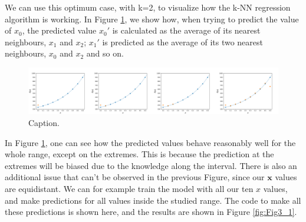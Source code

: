 \documentclass{article}%
\begin{document}
We can use this optimum case, with k=2, to visualize how the k-NN regression algorithm is working. In Figure \ref{fig:Fig2}, we show how, when trying to predict the value of $x_0$, the predicted value $x_0'$ is calculated as the average of its nearest neighbours, $x_1$ and $x_2$; $x_1'$ is predicted as the average of its two nearest neighbours, $x_0$ and $x_2$ and so on.

\begin{figure}[!htbp]
	\centering
	\includegraphics[width=1.0\textwidth]{figures/Fig2.png}
	\caption{Caption.}
	\label{fig:Fig2}
\end{figure}


In Figure \ref{fig:Fig2}, one can see how the predicted values behave reasonably well for the whole range, except on the extremes. This is because the prediction at the extremes will be biased due to the knowledge along the interval. There is also an additional issue that can't be observed in the previous Figure, since our $\mathbf{x}$ values are equidistant. We can for example train the model with all our ten $x$ values, and make predictions for all values inside the studied range. The code to make all these predictions is shown here, and the results are shown in Figure \ref{fig:Fig3_1}.
\end{document}
